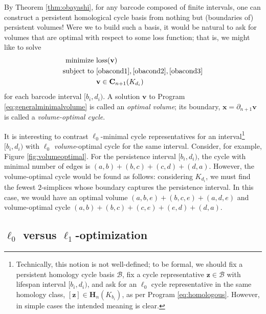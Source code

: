 \documentclass[utf8]{formatting_stuff/frontiersFPHY}
\newcommand{\Chains}{\mathbf{C}}
\newcommand{\Homologies}[0]{\mathbf{H}}
\newcommand{\optimalrep}{\mathbf{x}}
\newcommand{\cycle}{{\mathbf z}}
\newcommand{\fig}{Figure }
\newcommand{\volvec}{\mathbf{v}}
\newcommand{\loss}{\mathrm{loss}}
\newcommand{\pr}{Program }
\newcommand{\hcyclebasis}{\mathcal B}
\theoremstyle{plain}
\theoremstyle{definition}
\begin{document}
By Theorem \ref{thm:obayashi}, for any barcode composed of finite intervals, one can construct a persistent homological cycle basis from nothing but (boundaries of) persistent volumes!  Were we to build such a basis, it would be natural to ask for volumes that are optimal with respect to some loss function; that is, we might like to solve
\begin{align}
\begin{split}
    \text{minimize } & \loss(\volvec) \\
    \text{subject to } 
    & \eqref{obacond1}, \eqref{obacond2}, \eqref{obacond3}\\
    & \textbf{v} \in \Chains_{n+1}(K_{d_i}) 
\end{split}
\label{eq:generalminimalvolume}
\end{align}
for each barcode interval $[b_i, d_i)$.  A solution $\volvec$ to \pr \eqref{eq:generalminimalvolume} is called an \emph{optimal volume}; its boundary, $\optimalrep=\partial_{n+1}\volvec$ is called a \emph{volume-optimal cycle}.

It is interesting to contrast $\ell_0$-minimal cycle representatives for an interval\footnote{Technically, this notion is not well-defined; to be formal, we should fix a persistent homology cycle basis $\hcyclebasis$, fix a cycle representative $\cycle \in \hcyclebasis$ with lifespan interval $[b_i, d_i)$, and ask for an $\ell_0$ cycle representative in the same homology class, $[\cycle] \in \Homologies_n(K_{b_i})$, as per \pr \eqref{eq:homologous}.  However, in simple cases the intended meaning is clear.} $[b_i, d_i)$ with  $\ell_0$ \emph{volume}-optimal cycle for the same interval.  Consider, for example, \fig \ref{fig:volumeoptimal}.  For the persistence interval $[b_i,d_i)$, the cycle with minimal number of edges is $(a,b) + (b,c) + (c,d)  + (d,a)$. However, the volume-optimal cycle would be found as follows: considering $K_{d_i}$, we must find the fewest $2$-simplices whose boundary captures the persistence interval. In this case, we would have an optimal volume  $(a,b,e) + (b,c,e) + (a,d,e)$ and volume-optimal cycle $(a,b)+ (b,c) + (c,e) + (e,d)+ (d,a)$.

\subsection{$\ell_0$ versus $\ell_1$-optimization} \label{secl0l1}
\end{document}
